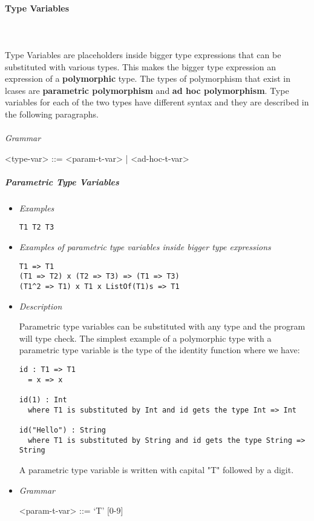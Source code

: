 \documentclass{article}
\begin{document}
\paragraph{Type Variables}
\mbox{}\\\\
Type Variables are placeholders inside bigger type expressions that can be
substituted with various types. This makes the bigger type expression an
expression of a \textbf{polymorphic} type. The types of polymorphism that exist
in lcases are \textbf{parametric polymorphism} and \textbf{ad hoc
polymorphism}. Type variables for each of the two types have different syntax
and they are described in the following paragraphs.
\\\\
\textit{Grammar}
\begin{grammar}
<type-var> ::= <param-t-var> | <ad-hoc-t-var> \\ 
\end{grammar}
\subparagraph{Parametric Type Variables}

\begin{itemize}
\item \textit{Examples}
\begin{verbatim}
T1 T2 T3 
\end{verbatim}

\item \textit{Examples of parametric type variables inside bigger type expressions}
\begin{verbatim}
T1 => T1
(T1 => T2) x (T2 => T3) => (T1 => T3)
(T1^2 => T1) x T1 x ListOf(T1)s => T1
\end{verbatim}

\item \textit{Description}

Parametric type variables can be substituted with any type and the program will
type check.  The simplest example of a polymorphic type with a parametric type
variable is the type of the identity function where we have:
\begin{verbatim}
id : T1 => T1
  = x => x

id(1) : Int
  where T1 is substituted by Int and id gets the type Int => Int

id("Hello") : String
  where T1 is substituted by String and id gets the type String => String
\end{verbatim}

A parametric type variable is written with capital "T" followed by a digit.

\item \textit{Grammar}
\begin{grammar}
<param-t-var> ::= `T' [0-9] \\ 
\end{grammar}
\end{itemize}
\end{document}
